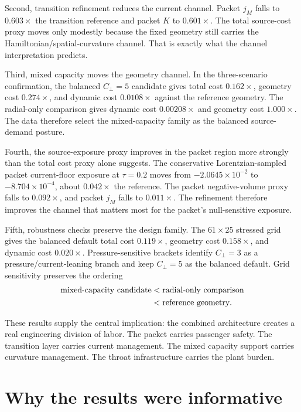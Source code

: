\documentclass[11pt]{article}
\begin{document}
Second, transition refinement reduces the current channel. Packet $j_M$ falls to $0.603\times$ the transition reference and packet $K$ to $0.601\times$. The total source-cost proxy moves only modestly because the fixed geometry still carries the Hamiltonian/spatial-curvature channel. That is exactly what the channel interpretation predicts.

Third, mixed capacity moves the geometry channel. In the three-scenario confirmation, the balanced $C_\perp=5$ candidate gives total cost $0.162\times$, geometry cost $0.274\times$, and dynamic cost $0.0108\times$ against the reference geometry. The radial-only comparison gives dynamic cost $0.00208\times$ and geometry cost $1.000\times$. The data therefore select the mixed-capacity family as the balanced source-demand posture.

Fourth, the source-exposure proxy improves in the packet region more strongly than the total cost proxy alone suggests. The conservative Lorentzian-sampled packet current-floor exposure at $\tau=0.2$ moves from $-2.0645\times10^{-2}$ to $-8.704\times10^{-4}$, about $0.042\times$ the reference. The packet negative-volume proxy falls to $0.092\times$, and packet $j_M$ falls to $0.011\times$. The refinement therefore improves the channel that matters most for the packet's null-sensitive exposure.

Fifth, robustness checks preserve the design family. The $61\times25$ stressed grid gives the balanced default total cost $0.119\times$, geometry cost $0.158\times$, and dynamic cost $0.020\times$. Pressure-sensitive brackets identify $C_\perp=3$ as a pressure/current-leaning branch and keep $C_\perp=5$ as the balanced default. Grid sensitivity preserves the ordering
\begin{equation}
\begin{aligned}
\hbox{mixed-capacity candidate}
&<\hbox{radial-only comparison}\\
&<\hbox{reference geometry}.
\end{aligned}
\end{equation}

These results supply the central implication: the combined architecture creates a real engineering division of labor. The packet carries passenger safety. The transition layer carries current management. The mixed capacity support carries curvature management. The throat infrastructure carries the plant burden.


\section{Why the results were informative}
\end{document}
